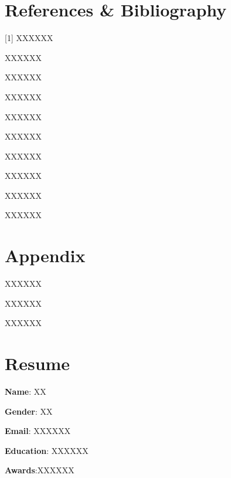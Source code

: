 \documentclass[12pt]{article}
\begin{document}
\begin{CJK*}{UTF8}{bsmi}
\pagestyle{fancy}




\section*{References \& Bibliography}




[1] XXXXXX
\par
[2] XXXXXX
\par
[3] XXXXXX
\par
[4] XXXXXX
\par
[5] XXXXXX
\par
[6] XXXXXX
\par
[7] XXXXXX
\par
[8] XXXXXX
\par
[9] XXXXXX
\par
[10] XXXXXX
\par





\newpage
{}
\section*{Appendix}
\par
[1] XXXXXX
\par
[2] XXXXXX
\par
[3] XXXXXX
\par



\newpage
{}
\section*{Resume}

\textbf{Name}: XX
\par
\textbf{Gender}: XX
\par
\textbf{Email}: XXXXXX
\par
\textbf{Education}: XXXXXX



\par
\textbf{Awards}:XXXXXX






\end{CJK*}
\end{document}
